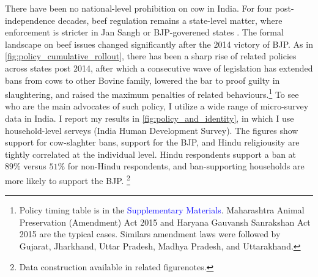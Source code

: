 \documentclass[11pt,twoside]{extarticle}
\newcommand{\suppmat}{\textcolor{blue}{Supplementary Materials}}
\begin{document}
There have been no national-level prohibition on cow in India. 
For four post-independence decades, beef regulation remains a state-level matter, where enforcement is stricter in Jan Sangh or BJP-goverened states \citep*{jaffrelotHinduNationalistMovement1999}. 
The formal landscape on beef issues changed significantly after the 2014 victory of BJP. As in \autoref{fig:policy_cumulative_rollout}, there has been a sharp rise of related policies across states post 2014, after which a consecutive wave of legislation has extended bans from cows to other Bovine family, lowered the bar to proof guilty in slaughtering, and raised the maximum penalties of related behaviours.\footnote{Policy timing table is in the \suppmat. Maharashtra Animal Preservation (Amendment) Act 2015 and Haryana Gauvansh Sanrakshan Act 2015 are the typical cases. Similars amendment laws were followed by Gujarat, Jharkhand, Uttar Pradesh, Madhya Pradesh, and Uttarakhand.} 
To see who are the main advocates of such policy, I utilize a wide range of micro-survey data in India. I report my results in \autoref{fig:policy_and_identity}, in which I use household-level serveys (India Human Development Survey). The figures show support for cow-slaghter bans, support for the BJP, and Hindu religiousity are tightly correlated at the individual level. Hindu respondents support a ban at $89\%$ versus $51\%$ for non-Hindu respondents, and ban-supporting households are more likely to support the BJP. \footnote{Data construction available in related figurenotes.}
\end{document}
